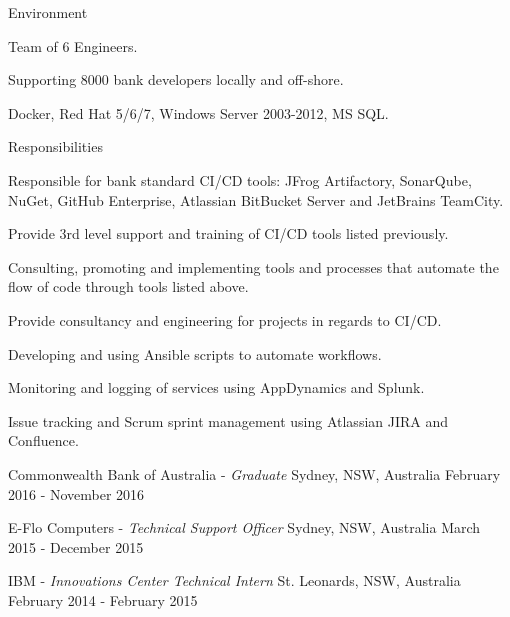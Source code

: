 \begin{cventries}
  \cventry
  {Environment} %
  {} %
  {} %
  {} %
  {
    \begin{cvitems} %
      \item {Team of 6 Engineers.}
      \item {Supporting 8000 bank developers locally and off-shore.}
      \item {Docker, Red Hat 5/6/7, Windows Server 2003-2012, MS SQL.}
    \end{cvitems}
  }

  \cventry
  {Responsibilities} %
  {} %
  {} %
  {} %
  {
    \begin{cvitems} %
      \item {Responsible for bank standard CI/CD tools: JFrog Artifactory, SonarQube, NuGet, GitHub Enterprise, Atlassian BitBucket Server and JetBrains TeamCity.}
      \item {Provide 3rd level support and training of CI/CD tools listed previously.}
      \item {Consulting, promoting and implementing tools and processes that automate the flow of code through tools listed above.}
      \item {Provide consultancy and engineering for projects in regards to CI/CD.}
      \item {Developing and using Ansible scripts to automate workflows.}
      \item {Monitoring and logging of services using AppDynamics and Splunk.}
      \item {Issue tracking and Scrum sprint management using Atlassian JIRA and Confluence.}
    \end{cvitems}
  }

  \cventry
  {} %
  {Commonwealth Bank of Australia - \emph{Graduate}} %
  {Sydney, NSW, Australia} %
  {February 2016 - November 2016} %
  {}



  \cventry
  {} %
  {E-Flo Computers - \emph{Technical Support Officer}} %
  {Sydney, NSW, Australia} %
  {March 2015 - December 2015} %
  {}


  \cventry
  {} %
  {IBM - \emph{Innovations Center Technical Intern}} %
  {St. Leonards, NSW, Australia} %
  {February 2014 - February 2015} %
  {}

\end{cventries}
